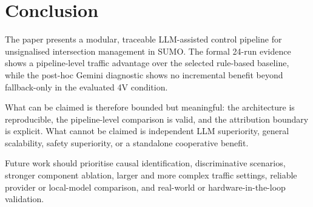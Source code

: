 \documentclass[letterpaper,10pt,conference]{ieeeconf}
\begin{document}
\section{Conclusion}
The paper presents a modular, traceable LLM-assisted control pipeline for unsignalised intersection management in SUMO. The formal 24-run evidence shows a pipeline-level traffic advantage over the selected rule-based baseline, while the post-hoc Gemini diagnostic shows no incremental benefit beyond fallback-only in the evaluated 4V condition.

What can be claimed is therefore bounded but meaningful: the architecture is reproducible, the pipeline-level comparison is valid, and the attribution boundary is explicit. What cannot be claimed is independent LLM superiority, general scalability, safety superiority, or a standalone cooperative benefit.

Future work should prioritise causal identification, discriminative scenarios, stronger component ablation, larger and more complex traffic settings, reliable provider or local-model comparison, and real-world or hardware-in-the-loop validation.



\end{document}
